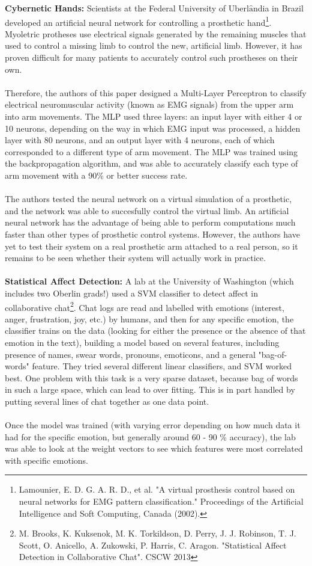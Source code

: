 \documentclass[11pt]{article}
\begin{document}
{\bf Cybernetic Hands:} Scientists at the Federal University of Uberl$\hat{\text{a}}$ndia in Brazil developed an artificial neural network for controlling a prosthetic hand\footnote{Lamounier, E. D. G. A. R. D., et al. "A virtual prosthesis control based on neural networks for EMG pattern classification." Proceedings of the Artificial Intelligence and Soft Computing, Canada (2002).}. Myoletric protheses use electrical signals generated by the remaining muscles that used to control a missing limb to control the new, artificial limb. However, it has proven difficult for many patients to accurately control such prostheses on their own. \\
\\
Therefore, the authors of this paper designed a Multi-Layer Perceptron to classify electrical neuromuscular activity (known as EMG signals) from the upper arm into arm movements. The MLP used three layers: an input layer with either 4 or 10 neurons, depending on the way in which EMG input was processed, a hidden layer with 80 neurons, and an output layer with 4 neurons, each of which corresponded to a different type of arm movement. The MLP was trained using the backpropagation algorithm, and was able to accurately classify each type of arm movement with a 90\% or better success rate. \\
\\
The authors tested the neural network on a virtual simulation of a prosthetic, and the network was able to succesfully control the virtual limb. An artificial neural network has the advantage of being able to perform computations much faster than other types of prosthetic control systems. However, the authors have yet to test their system on a real prosthetic arm attached to a real person, so it remains to be seen whether their system will actually work in practice.
\\
\\{\bf Statistical Affect Detection:} A lab at the University of Washington (which includes two Oberlin grads!) used a SVM classifier to detect affect in collaborative chat\footnote{M. Brooks, K. Kuksenok, M. K. Torkildson, D. Perry, J. J. Robinson, T. J. Scott, O. Anicello, A. Zukowski, P. Harris, C. Aragon. "Statistical Affect Detection in Collaborative Chat". CSCW 2013}. Chat logs are read and labelled with emotions (interest, anger, frustration, joy, etc.) by humans, and then for any specific emotion, the classifier trains on the data (looking for either the presence or the absence of that emotion in the text), building a model based on several features, including presence of names, swear words, pronouns, emoticons, and a general "bag-of-words" feature. They tried several different linear classifiers, and SVM worked best. One problem with this task is a very sparse dataset, because bag of words in such a large space, which can lead to over fitting. This is in part handled by putting several lines of chat together as one data point.\\
\\
Once the model was trained (with varying error depending on how much data it had for the specific emotion, but generally around 60 - 90 \% accuracy), the lab was able to look at the weight vectors to see which features were most correlated with specific emotions.
\end{document}
